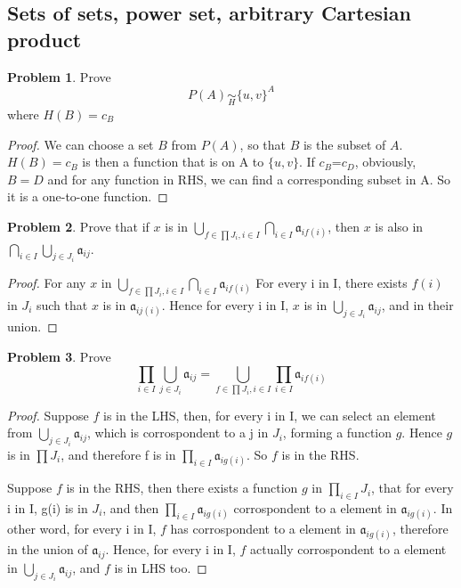 \documentclass[a4paper,11pt]{article}%
\theoremstyle{remark}
\theoremstyle{definition}
\newtheorem{problem}{Problem}[subsection]
\begin{document}
\subsection{Sets of sets, power set, arbitrary Cartesian product}
\begin{problem}
    Prove
    \[P(A)\underset{H}{\sim}\{u,v\}^A\]
    where $H(B)=c_B$
    \begin{proof}
        We can choose a set $B$ from $P(A)$, so that $B$ is the subset of $A$.
        $H(B)=c_B$ is then a function that is on A to  $\{u,v\}$.
        If $c_B$=$c_D$, obviously, $B=D$ and for any function in RHS, we can find a 
        corresponding subset in A. So it is a one-to-one function.
    \end{proof}
\end{problem}
\begin{problem}
    Prove that if $x$ is in $\bigcup_{f\in\prod J_i,i\in I}\bigcap_{i\in I}\mathfrak{a}_{if(i)}$,
    then $x$ is also in $\bigcap_{i\in I}\bigcup_{j\in J_i}\mathfrak{a}_{ij}$.
    \begin{proof}
       For any $x$ in  $\bigcup_{f\in\prod J_i,i\in I}\bigcap_{i\in I}\mathfrak{a}_{if(i)}$
       For every i in I, there exists $f(i)$ in $J_i$ such that $x$ is in $\mathfrak{a}_{ij(i)}$.
       Hence for every i in I, $x$ is in $\bigcup_{j\in J_i}\mathfrak{a}_{ij}$, and in their union.
    \end{proof}
\end{problem}
\begin{problem}
    Prove
    \[\prod_{i\in I}\bigcup_{j\in J_i}\mathfrak{a}_{ij}=\bigcup_{f\in \prod J_i,i\in I}\prod_{i\in I}\mathfrak{a}_{if(i)}\]
    \begin{proof}
    Suppose $f$ is in the LHS, then, for every i in I, we can select an element from
    $\bigcup_{j\in J_i}\mathfrak{a}_{ij}$, which is corrospondent to a j in $J_i$, forming a function $g$.
    Hence $g$ is in $\prod J_i$, and therefore f is in $\prod _{i\in I}\mathfrak{a}_{ig(i)}$.
    So $f$ is in the RHS.
    
    Suppose $f$ is in the RHS, then there exists a function $g$ in $\prod_{i\in I}J_i$,
    that for every i in I, g(i) is in $J_i$, and then $\prod_{i\in I}\mathfrak{a}_{ig(i)}$
    corrospondent to a element in $\mathfrak{a}_{ig(i)}$. In  other word, 
    for every i in I, $f$ has corrospondent to a element in $\mathfrak{a}_{ig(i)}$, therefore
    in the union of $\mathfrak{a}_{ij}$. Hence, for every i in I, $f$ actually corrospondent 
    to a element in $\bigcup_{j \in J_i}\mathfrak{a}_{ij}$, and $f$ is in LHS too. 
    \end{proof}
\end{problem}
\end{document}
